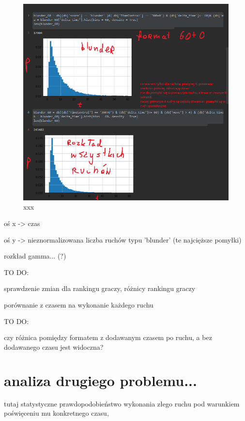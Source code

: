 \documentclass[inzynierska]{pwr_wmat_praca_dyplomowa}
\theoremstyle{plain}
\numberwithin{theorem}{chapter}
\theoremstyle{definition}
\numberwithin{theorem}{chapter}
\begin{document}
\begin{figure}[H]
	\centering
	\includegraphics[width=\textwidth]{sample60.png}
	\caption{xxx}\label{xxx}
\end{figure}


oś x -> czas

oś y -> nieznormalizowana liczba ruchów typu 'blunder' (te najcięższe pomyłki)\newline


rozkład gamma... (?)\newline 




TO DO: 

sprawdzenie zmian dla rankingu graczy, różnicy rankingu graczy

porównanie z czasem na wykonanie każdego ruchu\newline



TO DO: 

czy różnica pomiędzy formatem z dodawanym czasem po ruchu, a bez dodawanego czasu jest widoczna?



\section{analiza drugiego problemu...}
tutaj statystyczne prawdopodobieństwo wykonania złego ruchu pod warunkiem poświęceniu mu konkretnego czasu,\newline
\end{document}
